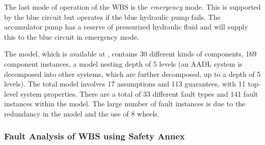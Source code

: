 The last mode of operation of the WBS is the \textit{emergency} mode. This is supported by the blue circuit but operates if the blue hydraulic pump fails. The accumulator pump has a reserve of pressurized hydraulic fluid and will supply this to the blue circuit in emergency mode.

The model, which is available at , contains 30 different kinds of components, 169 component instances, a model nesting depth of 5 levels (an AADL system is decomposed into other systems, which are further decomposed, up to a depth of 5 levels).  The total model involves 17 assumptions and 113 guarantees, with 11 top-level system properties.  There are a total of 33 different fault types and 141 fault instances within the model.  The large number of fault instances is due to the redundancy in the model and the use of 8 wheels.




\subsubsection{Fault Analysis of WBS using Safety Annex}

\iffalse

